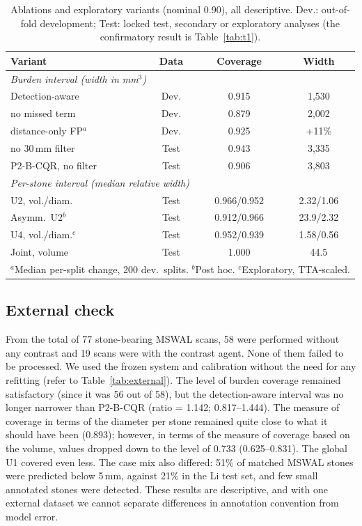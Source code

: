 \documentclass[conference]{IEEEtran}
\begin{document}
\begin{table}[t]
\caption{Ablations and exploratory variants (nominal 0.90), all descriptive. Dev.: out-of-fold development; Test: locked test, secondary or exploratory analyses (the confirmatory result is Table~\ref{tab:t1}).}
\label{tab:ablation}
\centering\footnotesize
\setlength{\tabcolsep}{3pt}
\begin{tabular}{lccc}
\toprule
Variant & Data & Coverage & Width \\
\midrule
\multicolumn{4}{l}{\emph{Burden interval (width in mm$^3$)}} \\
Detection-aware & Dev. & 0.915 & 1{,}530 \\
\quad no missed term & Dev. & 0.879 & 2{,}002 \\
\quad distance-only FP$^{a}$ & Dev. & 0.925 & +11\% \\
\quad no 30\,mm filter & Test & 0.943 & 3{,}335 \\
P2-B-CQR, no filter & Test & 0.906 & 3{,}803 \\
\midrule
\multicolumn{4}{l}{\emph{Per-stone interval (median relative width)}} \\
U2, vol./diam. & Test & 0.966/0.952 & 2.32/1.06 \\
Asymm.\ U2$^{b}$ & Test & 0.912/0.966 & 23.9/2.32 \\
U4, vol./diam.$^{c}$ & Test & 0.952/0.939 & 1.58/0.56 \\
Joint, volume & Test & 1.000 & 44.5 \\
\bottomrule
\multicolumn{4}{l}{\scriptsize $^{a}$Median per-split change, 200 dev.\ splits. $^{b}$Post hoc. $^{c}$Exploratory, TTA-scaled.}
\end{tabular}
\end{table}

\subsection{External check}
From the total of 77 stone-bearing MSWAL scans, 58 were performed without any contrast and 19 scans were with the contrast agent. None of them failed to be processed. We used the frozen system and calibration without the need for any refitting (refer to Table~\ref{tab:external}). The level of burden coverage remained satisfactory (since it was 56 out of 58), but the detection-aware interval was no longer narrower than P2-B-CQR (ratio = 1.142; 0.817--1.444). The measure of coverage in terms of the diameter per stone remained quite close to what it should have been (0.893); however, in terms of the measure of coverage based on the volume, values dropped down to the level of 0.733 (0.625--0.831). The global U1 covered even less. The case mix also differed: 51\% of matched MSWAL stones were predicted below 5\,mm, against 21\% in the Li test set, and few small annotated stones were detected. These results are descriptive, and with one external dataset we cannot separate differences in annotation convention from model error.
\end{document}
